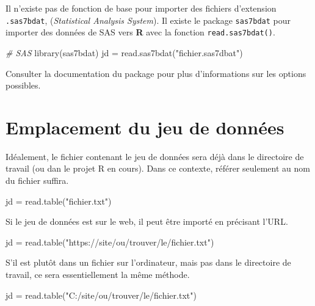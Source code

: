\documentclass[
]{book}
\newenvironment{Shaded}{}{}
\newcommand{\CommentTok}[1]{\textit{#1}}
\newcommand{\FunctionTok}[1]{#1}
\newcommand{\NormalTok}[1]{#1}
\newcommand{\OtherTok}[1]{#1}
\newcommand{\StringTok}[1]{#1}
\begin{document}
Il n'existe pas de fonction de base pour importer des fichiers d'extension \texttt{.sas7bdat}, (\emph{Statistical Analysis System}). Il existe le package \texttt{sas7bdat} pour importer des données de SAS vers \textbf{R} avec la fonction \texttt{read.sas7bdat()}.

\begin{Shaded}
\begin{Highlighting}[]
\CommentTok{\# SAS}
\FunctionTok{library}\NormalTok{(sas7bdat)}
\NormalTok{jd }\OtherTok{=} \FunctionTok{read.sas7bdat}\NormalTok{(}\StringTok{"fichier.sas7dbat"}\NormalTok{)}
\end{Highlighting}
\end{Shaded}

Consulter la documentation du package pour plus d'informations sur les options possibles.

\hypertarget{emplacement-du-jeu-de-donnuxe9es}{%
\section{Emplacement du jeu de données}\label{emplacement-du-jeu-de-donnuxe9es}}

Idéalement, le fichier contenant le jeu de données sera déjà dans le directoire de travail (ou dan le projet R en cours). Dans ce contexte, référer seulement au nom du fichier suffira.

\begin{Shaded}
\begin{Highlighting}[]
\NormalTok{jd }\OtherTok{=} \FunctionTok{read.table}\NormalTok{(}\StringTok{"fichier.txt"}\NormalTok{)}
\end{Highlighting}
\end{Shaded}

Si le jeu de données est sur le web, il peut être importé en précisant l'URL.

\begin{Shaded}
\begin{Highlighting}[]
\NormalTok{jd }\OtherTok{=} \FunctionTok{read.table}\NormalTok{(}\StringTok{"https://site/ou/trouver/le/fichier.txt"}\NormalTok{)}
\end{Highlighting}
\end{Shaded}

S'il est plutôt dans un fichier sur l'ordinateur, mais pas dans le directoire de travail, ce sera essentiellement la même méthode.

\begin{Shaded}
\begin{Highlighting}[]
\NormalTok{jd }\OtherTok{=} \FunctionTok{read.table}\NormalTok{(}\StringTok{"C:/site/ou/trouver/le/fichier.txt"}\NormalTok{)}
\end{Highlighting}
\end{Shaded}
\end{document}
